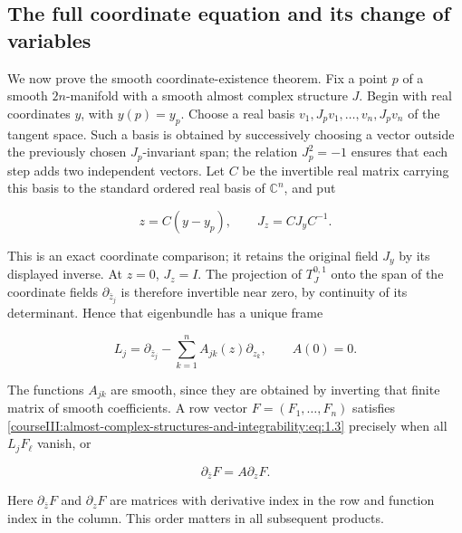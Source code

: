 \subsection{The full coordinate equation and its change of variables}
\label{courseIII:almost-complex-structures-and-integrability:coordinate-equation}

\label{courseIII:almost-complex-structures-and-integrability:section-6}

We now prove the smooth coordinate-existence theorem. Fix a point \(p\) of a smooth \(2n\)-manifold with a smooth almost complex structure \(J\). Begin with real coordinates \(y\), with \(y(p)=y_p\). Choose a real basis \(v_1,J_pv_1,\ldots,v_n,J_pv_n\) of the tangent space. Such a basis is obtained by successively choosing a vector outside the previously chosen \(J_p\)-invariant span; the relation \(J_p^2=-1\) ensures that each step adds two independent vectors. Let \(C\) be the invertible real matrix carrying this basis to the standard ordered real basis of \(\mathbb C^n\), and put

\begin{equation}
z=C(y-y_p),\qquad J_z=CJ_yC^{-1}.
\label{courseIII:almost-complex-structures-and-integrability:eq:6.1}
\end{equation}

This is an exact coordinate comparison; it retains the original field \(J_y\) by its displayed inverse. At \(z=0\), \(J_z=I\). The projection of \(T^{0,1}_J\) onto the span of the coordinate fields \(\partial_{\bar z_j}\) is therefore invertible near zero, by continuity of its determinant. Hence that eigenbundle has a unique frame

\begin{equation}
L_j=\partial_{\bar z_j}-\sum_{k=1}^n A_{jk}(z)\partial_{z_k},
\qquad A(0)=0.
\label{courseIII:almost-complex-structures-and-integrability:eq:6.2}
\end{equation}

The functions \(A_{jk}\) are smooth, since they are obtained by inverting that finite matrix of smooth coefficients. A row vector \(F=(F_1,\ldots,F_n)\) satisfies \eqref{courseIII:almost-complex-structures-and-integrability:eq:1.3} precisely when all \(L_jF_\ell\) vanish, or

\begin{equation}
\partial_{\bar z}F=A\partial_zF.
\label{courseIII:almost-complex-structures-and-integrability:eq:6.3}
\end{equation}

Here \(\partial_{\bar z}F\) and \(\partial_zF\) are matrices with derivative index in the row and function index in the column. This order matters in all subsequent products.

